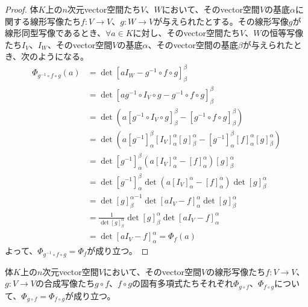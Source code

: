 \documentclass[dvipdfmx]{jsarticle}
\begin{document}
\begin{proof}
体$K$上の$n$次元vector空間たち$V$、$W$において、そのvector空間$V$の基底$\alpha$に関する線形写像たち$f:V \rightarrow V$、$g:W \rightarrow V$が与えられたとする。その線形写像$g$が線形同型写像であるとき、$\forall a \in K$に対し、そのvector空間たち$V$、$W$の恒等写像たち$I_{V}$、$I_{W}$、そのvector空間$V$の基底$\alpha$、そのvector空間の基底$\beta$が与えられたとき、次のようになる。
\begin{align*}
\varPhi_{g^{- 1} \circ f \circ g}(a) &= \det\left[ aI_{W} - g^{- 1} \circ f \circ g \right]_{\beta}^{\beta}\\
&= \det\left[ ag^{- 1} \circ I_{V} \circ g - g^{- 1} \circ f \circ g \right]_{\beta}^{\beta}\\
&= \det\left( a\left[ g^{- 1} \circ I_{V} \circ g \right]_{\beta}^{\beta} - \left[ g^{- 1} \circ f \circ g \right]_{\beta}^{\beta} \right)\\
&= \det\left( a\left[ g^{- 1} \right]^{\beta}_{\alpha}\left[ I_{V} \right]_{\alpha}^{\alpha}[ g]^{\alpha}_{\beta} - \left[ g^{- 1} \right]^{\beta}_{\alpha}[ f]_{\alpha}^{\alpha}[ g]^{\alpha}_{\beta} \right)\\
&= \det{\left[ g^{- 1} \right]^{\beta}_{\alpha}\left( a\left[ I_{V} \right]_{\alpha}^{\alpha} - [ f]_{\alpha}^{\alpha} \right)[ g]^{\alpha}_{\beta}}\\
&= \det\left[ g^{- 1} \right]^{\beta}_{\alpha}\det\left( a\left[ I_{V} \right]_{\alpha}^{\alpha} - [ f]_{\alpha}^{\alpha} \right)\det[ g]^{\alpha}_{\beta}\\
&= \det{[ g]^{\alpha}_{\beta}}^{- 1}\det\left[ aI_{V} - f \right]_{\alpha}^{\alpha}\det[ g]^{\alpha}_{\beta}\\
&= \frac{1}{\det[ g]^{\alpha}_{\beta}}\det[ g]^{\alpha}_{\beta}\det\left[ aI_{V} - f \right]_{\alpha}^{\alpha}\\
&= \det\left[ aI_{V} - f \right]_{\alpha}^{\alpha} = \varPhi_{f}(a)
\end{align*}
よって、$\varPhi_{g^{- 1} \circ f \circ g} = \varPhi_{f}$が成り立つ。
\end{proof}
\begin{thm}\label{2.2.2.10}
体$K$上の$n$次元vector空間$V$において、そのvector空間$V$の線形写像たち$f:V \rightarrow V$、$g:V \rightarrow V$の合成写像たち$g \circ f$、$f \circ g$の固有多項式たちそれぞれ$\varPhi_{g \circ f}$、$\varPhi_{f \circ g}$について、$\varPhi_{g \circ f} = \varPhi_{f \circ g}$が成り立つ。
\end{thm}
\end{document}
